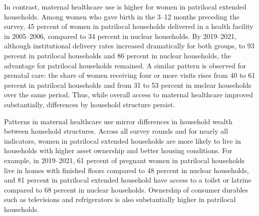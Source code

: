 \documentclass[10pt,twoside,reqno]{article}
\begin{document}
In contrast, maternal healthcare use is higher for women in patrilocal extended households. Among women who gave birth in the 3–12 months preceding the survey, 45 percent of women in patrilocal households delivered in a health facility in 2005–2006, compared to 34 percent in nuclear households. By 2019–2021, although institutional delivery rates increased dramatically for both groups, to 93 percent in patrilocal households and 86 percent in nuclear households, the advantage for patrilocal households remained. A similar pattern is observed for prenatal care: the share of women receiving four or more visits rises from 40 to 61 percent in patrilocal households and from 31 to 53 percent in nuclear households over the same period. Thus, while overall access to maternal healthcare improved substantially, differences by household structure persist.

Patterns in maternal healthcare use mirror differences in household wealth between household structures. Across all survey rounds and for nearly all indicators, women in patrilocal extended households are more likely to live in households with higher asset ownership and better housing conditions. For example, in 2019–2021, 61 percent of pregnant women in patrilocal households live in homes with finished floors compared to 48 percent in nuclear households, and 81 percent in patrilocal extended household have access to a toilet or latrine compared to 68 percent in nuclear households. Ownership of consumer durables such as televisions and refrigerators is also substantially higher in patrilocal households.
\end{document}
